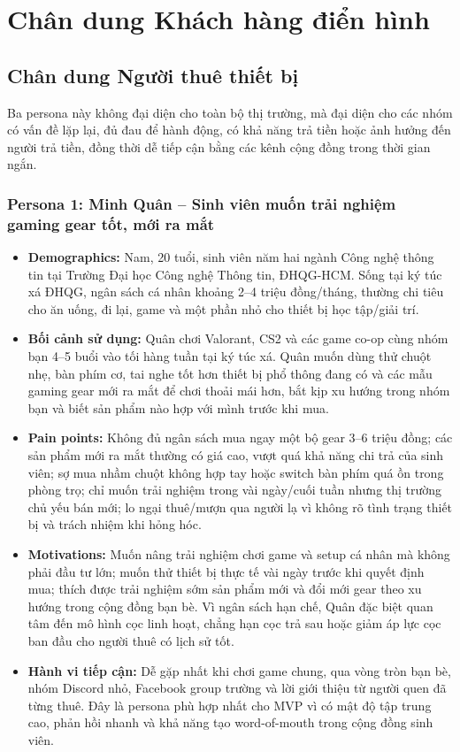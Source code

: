 \section{Chân dung Khách hàng điển hình}

\subsection{Chân dung Người thuê thiết bị}

Ba persona này không đại diện cho toàn bộ thị trường, mà đại diện cho các nhóm có vấn đề lặp lại, đủ đau để hành động, có khả năng trả tiền hoặc ảnh hưởng đến người trả tiền, đồng thời dễ tiếp cận bằng các kênh cộng đồng trong thời gian ngắn.

\subsubsection{Persona 1: Minh Quân -- Sinh viên muốn trải nghiệm gaming gear tốt, mới ra mắt}

\begin{itemize}
    \item \textbf{Demographics:} Nam, 20 tuổi, sinh viên năm hai ngành Công nghệ thông tin tại Trường Đại học Công nghệ Thông tin, ĐHQG-HCM. Sống tại ký túc xá ĐHQG, ngân sách cá nhân khoảng 2--4 triệu đồng/tháng, thường chi tiêu cho ăn uống, đi lại, game và một phần nhỏ cho thiết bị học tập/giải trí.
    \item \textbf{Bối cảnh sử dụng:} Quân chơi Valorant, CS2 và các game co-op cùng nhóm bạn 4--5 buổi vào tối hàng tuần tại ký túc xá. Quân muốn dùng thử chuột nhẹ, bàn phím cơ, tai nghe tốt hơn thiết bị phổ thông đang có và các mẫu gaming gear mới ra mắt để chơi thoải mái hơn, bắt kịp xu hướng trong nhóm bạn và biết sản phẩm nào hợp với mình trước khi mua.
    \item \textbf{Pain points:} Không đủ ngân sách mua ngay một bộ gear 3--6 triệu đồng; các sản phẩm mới ra mắt thường có giá cao, vượt quá khả năng chi trả của sinh viên; sợ mua nhầm chuột không hợp tay hoặc switch bàn phím quá ồn trong phòng trọ; chỉ muốn trải nghiệm trong vài ngày/cuối tuần nhưng thị trường chủ yếu bán mới; lo ngại thuê/mượn qua người lạ vì không rõ tình trạng thiết bị và trách nhiệm khi hỏng hóc.
    \item \textbf{Motivations:} Muốn nâng trải nghiệm chơi game và setup cá nhân mà không phải đầu tư lớn; muốn thử thiết bị thực tế vài ngày trước khi quyết định mua; thích được trải nghiệm sớm sản phẩm mới và đổi mới gear theo xu hướng trong cộng đồng bạn bè. Vì ngân sách hạn chế, Quân đặc biệt quan tâm đến mô hình cọc linh hoạt, chẳng hạn cọc trả sau hoặc giảm áp lực cọc ban đầu cho người thuê có lịch sử tốt.
    \item \textbf{Hành vi tiếp cận:} Dễ gặp nhất khi chơi game chung, qua vòng tròn bạn bè, nhóm Discord nhỏ, Facebook group trường và lời giới thiệu từ người quen đã từng thuê. Đây là persona phù hợp nhất cho MVP vì có mật độ tập trung cao, phản hồi nhanh và khả năng tạo word-of-mouth trong cộng đồng sinh viên.
\end{itemize}

